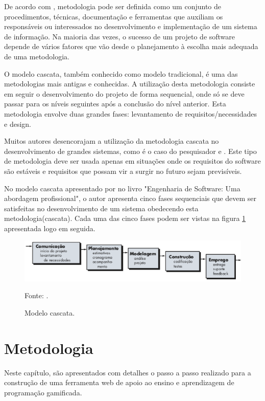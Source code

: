De acordo com , metodologia pode ser definida como um conjunto de procedimentos, técnicas, documentação e ferramentas que 
auxiliam os responsáveis ou interessados no desenvolvimento e implementação de um sistema de informação. Na maioria das vezes, o sucesso
de um projeto de software depende de vários fatores que vão desde o planejamento à escolha mais adequada de uma metodologia.

O modelo cascata, também conhecido como modelo tradicional, é uma das metodologias mais antigas e conhecidas. A utilização desta 
metodologia consiste em seguir o desenvolvimento do projeto de forma sequencial, onde só se deve passar para os níveis seguintes após
a conclusão do nível anterior. Esta metodologia envolve duas grandes fases: levantamento de requisitos/necessidades e design. \cite{semedo2012ganhos}

Muitos autores desencorajam a utilização da metodologia cascata no desenvolvimento de grandes sistemas, como é o caso do pesquisador
  e . Este tipo de metodologia deve ser usada apenas em situações onde os requisitos do software são estáveis e requisitos
que possam vir a surgir no futuro sejam previsíveis. \cite{semedo2012ganhos}


No modelo cascata apresentado por  no livro "Engenharia de Software: Uma abordagem profissional", o autor
apresenta cinco fases sequenciais que devem ser satisfeitas no desenvolvimento de um sistema obedecendo esta metodologia(cascata). 
Cada uma das cinco fases podem ser vistas na figura \ref{cascata} apresentada logo em seguida.

\begin{figure}[h]
	\centering
	\includegraphics[keepaspectratio=true,scale=0.6]{figuras/cascata.png}
	\caption{Modelo cascata.}
	Fonte: \cite{pressman}.
	\label{cascata}
\end{figure}


\chapter{Metodologia}

Neste capítulo, são apresentados com detalhes o passo a passo realizado para a construção de uma ferramenta web de apoio ao ensino e aprendizagem 
de programação gamificada.

